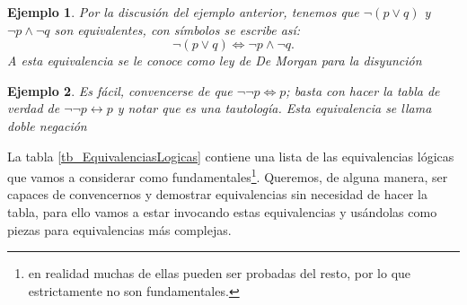 \documentclass{book}
\newtheorem*{ejm}{Ejemplo}
\begin{document}
\begin{ejm}
	Por la discusión del ejemplo anterior, tenemos que $\neg (p \vee q)$ y $\neg p \wedge \neg q$ son equivalentes, con símbolos se escribe así: \[\neg (p \vee q) \iff \neg p \wedge \neg q.\]
	A esta equivalencia se le conoce como \emph{ley de De Morgan para la disyunción}
\end{ejm}

\begin{ejm}
	Es fácil, convencerse de que $\neg \neg p \iff p$; basta con hacer la tabla de verdad de $\neg \neg p \leftrightarrow p$ y notar que es una tautología. Esta equivalencia se llama \emph{doble negación}
\end{ejm}

La tabla \ref{tb_EquivalenciasLogicas} contiene una lista de las equivalencias lógicas que vamos a considerar como fundamentales\footnote{en realidad muchas de ellas pueden ser probadas del resto, por lo que estrictamente no son fundamentales.}.
Queremos, de alguna manera, ser capaces de convencernos y demostrar equivalencias sin necesidad de hacer la tabla, para ello vamos a estar invocando estas equivalencias y usándolas como piezas para equivalencias más complejas.
\end{document}
